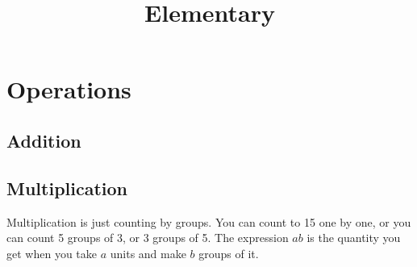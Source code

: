 \documentclass[12pt]{article}
\title{Elementary}
\author{}
\date{}
\begin{document}
\maketitle
\tableofcontents

\newpage

\section{Operations}

\subsection{Addition}

\subsection{Multiplication}

Multiplication is just counting by groups.
You can count to 15 one by one, or you can count 5 groups of 3, or 3 groups of 5.
The expression \( ab \)
is the quantity you get when you take \( a \) units and make \( b \) groups of it.

\end{document}
